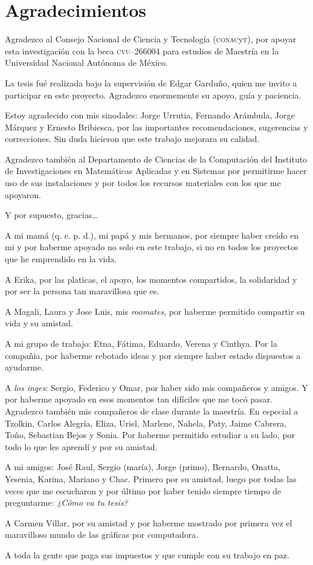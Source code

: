 \chapter*{Agradecimientos}

{\small
Agradezco al Consejo Nacional de Ciencia y Tecnología (\textsc{conac}y\textsc{t}), por apoyar esta investigación con la beca \textsc{cvu}--266004 para estudios de Maestría en la Universidad Nacional Autónoma de México.

La tesis fué realizada bajo la supervisión de Edgar Garduño, quien me invito a participar en este proyecto. Agradezco enormemente su apoyo, guía y paciencia.

Estoy agradecido con mis sinodales: Jorge Urrutia, Fernando Arámbula, Jorge Márquez y Ernesto Bribiesca, por las importantes recomendaciones, sugerencias y correcciones. Sin duda hicieron que este trabajo mejorara su calidad. 

Agradezco también al Departamento de Ciencias de la Computación del Instituto de Investigaciones en Matemáticas Aplicadas y en Sistemas por permitirme hacer uso de sus instalaciones y por todos los recursos materiales con los que me apoyaron.

Y por supuesto, gracias\ldots

A mi mamá (q. e. p. d.), mi papá y mis hermanos, por siempre haber creído en mi y por haberme apoyado no solo en este trabajo, si no en todos los proyectos que he emprendido en la vida.

A Erika, por las platicas, el apoyo, los momentos compartidos, la solidaridad y por ser la persona tan maravillosa que es.

A Magali, Laura y Jose Luis, mis \emph{roomates}, por haberme permitido compartir su vida y su amistad.

A mi grupo de trabajo: Etna, Fátima, Eduardo, Verena y Cinthya. Por la compañia, por haberme rebotado ideas y por siempre haber estado dispuestos a ayudarme.

A \emph{los inges}: Sergio, Federico y Omar, por haber sido mis compañeros y amigos. Y por haberme apoyado en esos momentos tan difíciles que me tocó pasar. Agradezco también mis compañeros de clase durante la maestría. En especial a Tzolkin, Carlos Alegría, Eliza, Uriel, Marlene, Nahela, Paty, Jaime Cabrera, Toño, Sebastian Bejos y Sonia. Por haberme permitido estudiar a su lado, por todo lo que les aprendí y por su amistad.

A mi amigos: José Raul, Sergio (maría), Jorge (primo), Bernardo, Onatta, Yesenia, Karina, Mariano y Chac. Primero por su amistad, luego por todas las veces que me escucharon y por último por haber tenido siempre tiempo de preguntarme: \emph{¿Cómo va tu tesis?}

A Carmen Villar, por su amistad y por haberme mostrado por primera vez el maravilloso mundo de las gráficas por computadora.

A toda la gente que paga sus impuestos y que cumple con su trabajo en paz.
}
